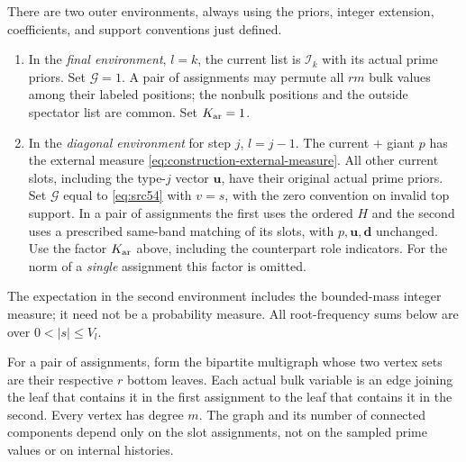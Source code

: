 There are two outer environments, always using the priors, integer
extension, coefficients, and support conventions just defined.
\begin{enumerate}[label=(\alph*)]
 \item In the \emph{final environment}, $l=k$, the current list is
       $\mathcal I_k$ with its actual prime priors.  Set
       $\mathcal G=1$.  A pair of assignments may permute all $rm$
       bulk values among their labeled positions; the nonbulk
       positions and the outside spectator list are common.
       Set $K_{\rm ar}=1$.
 \item In the \emph{diagonal environment} for step $j$, $l=j-1$.
       The current $+$ giant $p$ has the external measure
       \eqref{eq:construction-external-measure}.  All other current
       slots, including the type-$j$ vector $\mathbf u$, have their
       original actual prime priors.  Set $\mathcal G$ equal to
       \eqref{eq:src54} with $v=s$, with the zero convention on
       invalid top support.  In a pair of assignments the first
       uses the ordered $H$ and the second uses a prescribed
       same-band matching of its slots, with $p,\mathbf u,
       \mathbf d$ unchanged.  Use the factor $K_{\rm ar}$ above,
       including the counterpart role indicators.  For the norm
       of a \emph{single} assignment this factor is omitted.
\end{enumerate}
The expectation in the second environment includes the
bounded-mass integer measure; it need not be a probability measure.
All root-frequency sums below are over $0<|s|\le V_l$.

For a pair of assignments, form the bipartite multigraph whose two
vertex sets are their respective $r$ bottom leaves.  Each actual
bulk variable is an edge joining the leaf that contains it in the
first assignment to the leaf that contains it in the second.
Every vertex has degree $m$.  The graph and its number of connected
components depend only on the slot assignments, not on the sampled
prime values or on internal histories.

